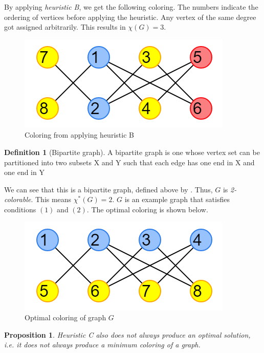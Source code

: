 \documentclass{article}
\newtheorem{prop}{Proposition}
\theoremstyle{definition}
\newtheorem*{definition}{Definition}
\begin{document}
By applying \emph{heuristic B}, we get the following coloring. The numbers indicate the ordering of vertices before applying the heuristic. Any vertex of the same degree got assigned arbitrarily. This results in \(\chi(G) = 3\).

\begin{figure}[H]
\centering
\includegraphics[scale=0.6]{images/graph-2.png}
\caption{Coloring from applying heuristic B}
\end{figure}

\begin{definition}[Bipartite graph]
A bipartite graph is one whose vertex set can be partitioned into two subsets X and Y such that each edge has one end in X and one end in Y
\end{definition}

We can see that this is a bipartite graph, defined above by \cite{bondymurty}. Thus, \(G\) is \emph{2-colorable}. This means \(\chi^{*}(G) = 2\). \(G\) is an example graph that satisfies conditions \((1)\) and \((2)\). The optimal coloring is shown below.

\begin{figure}[H]
\centering
\includegraphics[scale=0.6]{images/graph-3.png}
\caption{Optimal coloring of graph \(G\)}
\end{figure}

\begin{prop}
Heuristic C also does not always produce an optimal solution, i.e. it does not always produce a minimum coloring of a graph.
\end{prop}
\end{document}

